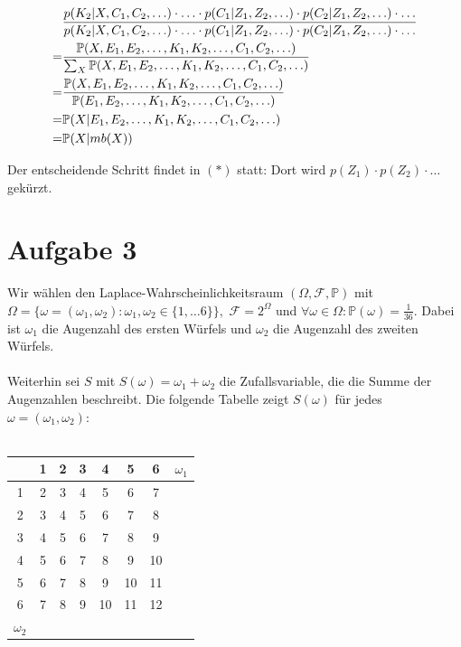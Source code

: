 \documentclass[a4paper]{article}
\newcommand{\IP}{\mathbb{P}}
\newcommand{\F}{\mathscr{F}}
\begin{document}
\begin{align}
	& \frac{p(K_2|X,C_1,C_2,\ldots) \cdot \ldots \cdot p(C_1|Z_1,Z_2,\ldots) \cdot p(C_2|Z_1,Z_2,\ldots) \cdot \ldots}{p(K_2|X,C_1,C_2,\ldots) \cdot \ldots \cdot p(C_1|Z_1,Z_2,\ldots) \cdot p(C_2|Z_1,Z_2,\ldots) \cdot \ldots} \notag \\
	=& \frac{\IP(X,E_1,E_2,\ldots,K_1,K_2,\ldots,C_1,C_2,\ldots)}{\sum_{X} \IP(X,E_1,E_2,\ldots,K_1,K_2,\ldots,C_1,C_2,\ldots)} \notag \\
	=& \frac{\IP(X,E_1,E_2,\ldots,K_1,K_2,\ldots,C_1,C_2,\ldots)}{\IP(E_1,E_2,\ldots,K_1,K_2,\ldots,C_1,C_2,\ldots)} \notag \\
	=& \IP(X|E_1,E_2,\ldots,K_1,K_2,\ldots,C_1,C_2,\ldots) \notag \\
	=& \IP(X|mb(X)) \notag
\end{align}

Der entscheidende Schritt findet in $(\ast)$ statt: Dort wird $p(Z_1) \cdot p(Z_2) \cdot \ldots$ gek\"urzt.

\section*{Aufgabe 3}
Wir w\"ahlen den Laplace-Wahrscheinlichkeitsraum $(\Omega, \F, \IP)$ mit $\Omega = \{\omega=(\omega_1, \omega_2) : \omega_1,\omega_2 \in \{1, \dots 6\}\},$
$\F=2^\Omega$ und $\forall \omega \in \Omega: \IP(\omega) = \frac{1}{36}$. Dabei ist $\omega_1$ die Augenzahl des ersten W\"urfels und $\omega_2$ die Augenzahl des zweiten W\"urfels.\\
\\
Weiterhin sei $S$ mit $S(\omega) = \omega_1+\omega_2$ die Zufallsvariable, die die Summe der Augenzahlen beschreibt. Die folgende Tabelle zeigt $S(\omega)$ f\"ur jedes $\omega = (\omega_1,\omega_2)$:\\
\\
\begin{tabular}{c|ccccccc}
            & 1 & 2 & 3 &  4 &  5 &  6 & $\omega_1$ \\
\hline
          1 & 2 & 3 & 4 &  5 &  6 &  7 &            \\
          2 & 3 & 4 & 5 &  6 &  7 &  8 &            \\
          3 & 4 & 5 & 6 &  7 &  8 &  9 &            \\
          4 & 5 & 6 & 7 &  8 &  9 & 10 &            \\
          5 & 6 & 7 & 8 &  9 & 10 & 11 &            \\
          6 & 7 & 8 & 9 & 10 & 11 & 12 &            \\
 $\omega_2$ &   &   &   &    &    &    &            \\
\end{tabular}
\end{document}
